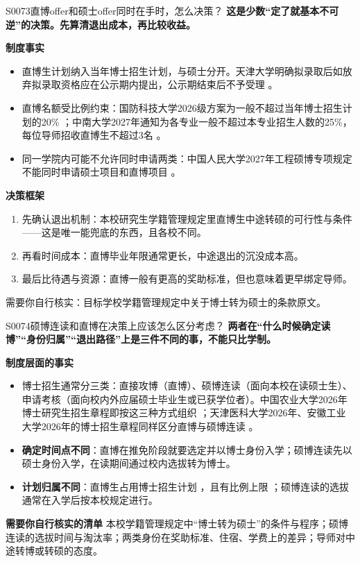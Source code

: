 \begin{qa}{S0073}{直博offer和硕士offer同时在手时，怎么决策？}
\textbf{这是少数“定了就基本不可逆”的决策。先算清退出成本，再比较收益。}

\textbf{制度事实}
\begin{itemize}
  \item 直博生计划纳入当年博士招生计划，与硕士分开。天津大学明确拟录取后如放弃拟录取资格应在公示期内提出，公示期结束后不予受理 。
  \item 直博名额受比例约束：国防科技大学2026级方案为一般不超过当年博士招生计划的20\% ；中南大学2027年通知为各专业一般不超过本专业招生人数的25\%，每位导师招收直博生不超过3名 。
  \item 同一学院内可能不允许同时申请两类：中国人民大学2027年工程硕博专项规定不能同时申请硕士项目和直博项目 。
\end{itemize}

\textbf{决策框架}
\begin{enumerate}
  \item 先确认退出机制：本校研究生学籍管理规定里直博生中途转硕的可行性与条件——这是唯一能兜底的东西，且各校不同。
  \item 再看时间成本：直博毕业年限通常更长，中途退出的沉没成本高。
  \item 最后比待遇与资源：直博一般有更高的奖助标准，但也意味着更早绑定导师。
\end{enumerate}

需要你自行核实：目标学校学籍管理规定中关于博士转为硕士的条款原文。
\end{qa}

\begin{qa}{S0074}{硕博连读和直博在决策上应该怎么区分考虑？}
\textbf{两者在“什么时候确定读博”“身份归属”“退出路径”上是三件不同的事，不能只比学制。}

\textbf{制度层面的事实}
\begin{itemize}
  \item 博士招生通常分三类：直接攻博（直博）、硕博连读（面向本校在读硕士生）、申请考核（面向校内外应届硕士毕业生或已获学位者）。中国农业大学2026年博士研究生招生章程即按这三种方式组织 ；天津医科大学2026年、安徽工业大学2026年的博士招生章程同样区分直博与硕博连读 。
  \item \textbf{确定时间点不同}：直博在推免阶段就要选定并以博士身份入学；硕博连读先以硕士身份入学，在读期间通过校内选拔转为博士。
  \item \textbf{计划归属不同}：直博生占用博士招生计划 ，且有比例上限 ；硕博连读的选拔通常在入学后按本校规定进行。
\end{itemize}

\textbf{需要你自行核实的清单}
本校学籍管理规定中“博士转为硕士”的条件与程序；硕博连读的选拔时间与淘汰率；两类身份在奖助标准、住宿、学费上的差异；导师对中途转博或转硕的态度。
\end{qa}

